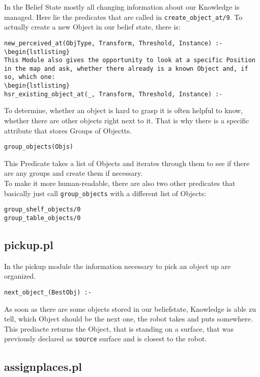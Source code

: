 \documentclass[main.tex]{subfiles}
\begin{document}
In the Belief State mostly all changing information about our Knowledge is managed. Here lie the predicates that are called in \texttt{create\_object\_at/9}. To actually create a new Object in our belief state, there is:
\begin{lstlisting}
new_perceived_at(ObjType, Transform, Threshold, Instance) :-
\begin{lstlisting}
This Module also gives the opportunity to look at a specific Position in the map and ask, whether there already is a known Object and, if so, which one:
\begin{lstlisting}
hsr_existing_object_at(_, Transform, Threshold, Instance) :-
\end{lstlisting}
To determine, whether an object is hard to grasp it is often helpful to know, whether there are other objects right next to it. That is why there is a specific attribute that stores Groups of Objectts. 
\begin{lstlisting}
group_objects(Objs)
\end{lstlisting}
This Predicate takes a list of Objects and iterates through them to see if there are any groups and create them if necessary.\\
To make it more human-readable, there are also two other predicates that basically just call \texttt{group\_objects} with a different list of Objects:
\begin{lstlisting}
group_shelf_objects/0
group_table_objects/0
\end{lstlisting}

\subsection{pickup.pl}

In the pickup module the information necessary to pick an object up are organized.

\begin{lstlisting}
next_object_(BestObj) :-
\end{lstlisting}
As soon as there are some objects stored in our beliefstate, Knowledge is able zu tell, which Object should be the next one, the robot takes and puts somewhere. This prediacte returns the Object, that is standing on a surface, that was previously declared as \texttt{source} surface and is closest to the robot.

\subsection{assignplaces.pl}
\end{document}
